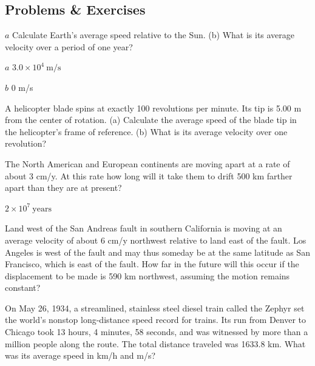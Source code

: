 \documentclass[
]{book}
\newenvironment{problems-exercises}{}{}
\begin{document}
\hypertarget{fs-id1644454}{}
\begin{problems-exercises}

\hypertarget{problems-exercises-1}{%
\subsection{Problems \& Exercises}\label{problems-exercises-1}}

\hypertarget{fs-id4131776}{}
\leavevmode\hypertarget{fs-id1489911}{}%
\(a\) Calculate Earth's average speed relative to the Sun. (b) What is
its average velocity over a period of one year?

\leavevmode\hypertarget{fs-id3602083}{}%
\(a\) \({3\text{.}{\text{0} \times \text{10}^{4}\ }\text{m/s}}{}\)

\(b\) 0 m/s

\hypertarget{fs-id3514248}{}
\leavevmode\hypertarget{fs-id1773543}{}%
A helicopter blade spins at exactly 100 revolutions per minute. Its tip
is 5.00 m from the center of rotation. (a) Calculate the average speed
of the blade tip in the helicopter's frame of reference. (b) What is
its average velocity over one revolution?

\hypertarget{fs-id1438634}{}
\leavevmode\hypertarget{fs-id1738040}{}%
The North American and European continents are moving apart at a rate of
about 3 cm/y. At this rate how long will it take them to drift 500 km
farther apart than they are at present?

\leavevmode\hypertarget{fs-id2587370}{}%
\({{2 \times \text{10}^{7}}\ \text{years}}{}\)

\hypertarget{fs-id2572316}{}
\leavevmode\hypertarget{fs-id1275687}{}%
Land west of the San Andreas fault in southern California is moving at
an average velocity of about 6 cm/y northwest relative to land east of
the fault. Los Angeles is west of the fault and may thus someday be at
the same latitude as San Francisco, which is east of the fault. How far
in the future will this occur if the displacement to be made is 590 km
northwest, assuming the motion remains constant?

\hypertarget{fs-id1403452}{}
\leavevmode\hypertarget{fs-id1357553}{}%
On May 26, 1934, a streamlined, stainless steel diesel train called the
Zephyr set the world's nonstop long-distance speed record for trains.
Its run from Denver to Chicago took 13 hours, 4 minutes, 58 seconds, and
was witnessed by more than a million people along the route. The total
distance traveled was 1633.8 km. What was its average speed in km/h and
m/s?


\end{problems-exercises}
\end{document}
